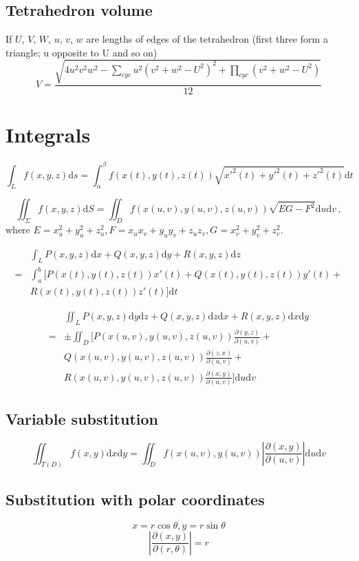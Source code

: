 	\subsection{Tetrahedron volume}
	If $U$, $V$, $W$, $u$, $v$, $w$ are lengths of edges of the tetrahedron (first three form a triangle; u opposite to U and so on)
	\[ V = \frac{\sqrt{ 4u^2v^2w^2 - \sum_{cyc}{u^2(v^2+w^2-U^2)^2} + \prod_{cyc}{(v^2+w^2-U^2)} }}{12} \]

\section{Integrals}
	$$\int_Lf(x,y,z)\mathrm{d}s=\int_\alpha^\beta f(x(t),y(t),z(t))\sqrt{x'^2(t)+y'^2(t)+z'^2(t)}\mathrm{d}t$$

	$$\iint_\Sigma f(x,y,z)\mathrm{d}S=\iint_D f(x(u,v),y(u,v),z(u,v))\sqrt{EG-F^2}\mathrm{d}u\mathrm{d}v\,,$$
	where $E=x_u^2+y_u^2+z_u^2,F=x_ux_v+y_uy_v+z_uz_v,G=x_v^2+y_v^2+z_v^2$.

	\begin{align*}
	&\int_L P(x,y,z)\mathrm{d}x+Q(x,y,z)\mathrm{d}y+R(x,y,z)\mathrm{d}z\\
	=&\int_a^b[P(x(t),y(t),z(t))x'(t)+Q(x(t),y(t),z(t))y'(t)+\\
	&R(x(t),y(t),z(t))z'(t)]\mathrm{d}t
	\end{align*}

	\begin{align*}
	&\iint_L P(x,y,z)\mathrm{d}y\mathrm{d}z+Q(x,y,z)\mathrm{d}z\mathrm{d}x+R(x,y,z)\mathrm{d}x\mathrm{d}y\\
	=&\pm \iint_D[P(x(u,v),y(u,v),z(u,v))\frac{\partial(y,z)}{\partial(u,v)}+\\
	&Q(x(u,v),y(u,v),z(u,v))\frac{\partial(z,x)}{\partial(u,v)}+\\
	&R(x(u,v),y(u,v),z(u,v))\frac{\partial(x,y)}{\partial(u,v)}]\mathrm{d}u\mathrm{d}v
	\end{align*}

	\subsection{Variable substitution}
	$$\iint_{T(D)}f(x,y)\mathrm{d}x\mathrm{d}y=\iint_{D}f(x(u,v),y(u,v))\left|\frac{\partial(x,y)}{\partial(u,v)}\right|\mathrm{d}u\mathrm{d}v$$
	\subsection{Substitution with polar coordinates}
	$$x=r\cos\theta,y=r\sin\theta$$
	$$\left|\frac{\partial(x,y)}{\partial(r,\theta)}\right|=r$$
